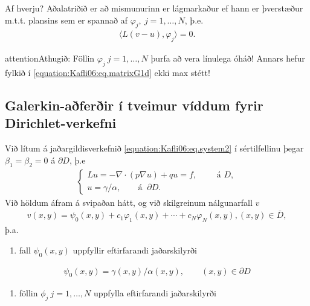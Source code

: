 \documentclass[a4paper,10pt,icelandic]{sphinxmanual}
\begin{document}
Af hverju? Aðalatriðið er að mismunurinn er lágmarkaður ef hann er þverstæður m.t.t. plansins sem er spannað af \(\varphi_j, ~j=1, \dots, N\), þ.e.
\begin{equation*}
\begin{split}{{\langle L(v-u),\varphi_j\rangle}}=0.\end{split}
\end{equation*}
\begin{sphinxadmonition}{attention}{Athugið:}
Föllin \(\varphi_j~j=1, \dots, N\) þurfa að vera línulega óháð! Annars hefur fylkið í \eqref{equation:Kafli06:eq.matrixG1d} ekki max stétt!
\end{sphinxadmonition}


\subsection{Galerkin-aðferðir í tveimur víddum fyrir Dirichlet-verkefni}
\label{\detokenize{Kafli06:galerkin-aferir-i-tveimur-viddum-fyrir-dirichlet-verkefni}}
Við lítum á jaðargildisverkefnið \eqref{equation:Kafli06:eq.system2} í sértilfellinu þegar \(\beta_1 =\beta_2=0\) á \(\partial D\), þ.e
\begin{equation}\label{equation:Kafli06:eq.diri2}
\begin{split}\begin{cases}
Lu=-\nabla\cdot (p\nabla u)+qu=f, \qquad \text{ á } D,\\
u=\gamma/\alpha, \qquad  \text{á } \ \partial D.
\end{cases}\end{split}
\end{equation}
Við höldum áfram á svipaðan hátt, og við skilgreinum nálgunarfall \(v\)
\begin{equation*}
\begin{split}v(x,y)=\psi_0(x,y)+c_1\varphi_1(x,y)+\cdots+c_N\varphi_N(x,y),
(x,y) \in \bar D,\end{split}
\end{equation*}
þ.a.
\begin{enumerate}
\def\theenumi{\arabic{enumi}}
\def\labelenumi{\theenumi .}
\makeatletter\def\p@enumii{\p@enumi \theenumi .}\makeatother
\item {} 
fall \(\psi_0(x,y)\) uppfyllir eftirfarandi jaðarskilyrði

\end{enumerate}
\begin{equation*}
\begin{split}\psi_0(x,y)=\gamma(x,y)/\alpha(x,y), \qquad (x,y) \in \partial D\end{split}
\end{equation*}\begin{enumerate}
\def\theenumi{\arabic{enumi}}
\def\labelenumi{\theenumi .}
\makeatletter\def\p@enumii{\p@enumi \theenumi .}\makeatother
\setcounter{enumi}{1}
\item {} 
föllin \(\phi_j~j=1, \dots, N\) uppfylla eftirfarandi jaðarskilyrði

\end{enumerate}
\end{document}
